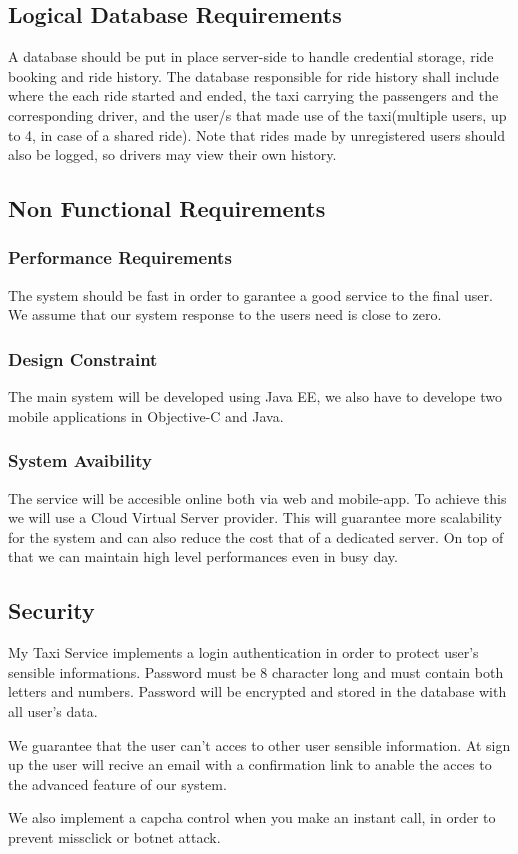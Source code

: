\subsection{Logical Database Requirements}
	A database should be put in place server-side to handle credential storage, ride booking and ride history. The database responsible for ride history
	shall include where the each ride started and ended, the taxi carrying the passengers and the corresponding driver, and the user/s that made use of the
	taxi(multiple users, up to 4, in case of a shared ride). Note that rides made by unregistered users should also be logged, so drivers may view their own history.
\subsection {Non Functional Requirements}
 	\subsubsection{Performance Requirements}
 		The system should be fast in order to garantee a good service to the final user. We  assume that our system response to the users need is close to zero.
	\subsubsection {Design Constraint}
		The main system will be developed using Java EE, we also have to develope two mobile applications in
		Objective-C and Java.
	\subsubsection {System Avaibility}
		The service will be accesible online both via web and mobile-app. To achieve this we will use a Cloud Virtual Server provider. This will guarantee more scalability
		for the system and can also reduce the cost that of a dedicated server. On top of that we can maintain high level performances even	in busy day.
\subsection {Security}
	My Taxi Service implements a login authentication in order to protect user's sensible informations. Password must be 8 character long and must contain both letters
	and numbers. Password will be encrypted and stored in the database with all user's data.

	We guarantee that the user can't acces to other user sensible information.
	At sign up the user will recive an email with a confirmation link to anable the acces to the advanced feature of our system.

	We also implement a capcha control when you make an instant call, in order to prevent missclick or botnet attack.
